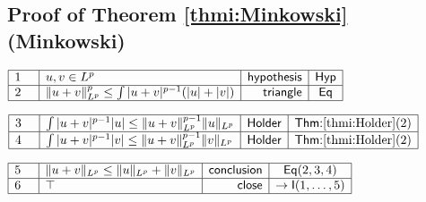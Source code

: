 \documentclass[11pt,reqno]{amsart}
\begin{document}
	\subsection*{Proof of Theorem \protect\ref{thmi:Minkowski} (\textsf{Minkowski})}
	\noindent$\begin{array}{|m{0.5cm}|l|r|c|}
	\hline
	1 & u,v\in L^{p} & \mathsf{hypothesis} & \mathsf{Hyp} \\ \hline
	2 & \|u+v\|_{L^{p}}^{p}\le\int|u+v|^{p-1}(|u|+|v|) & \mathsf{triangle} & \mathsf{Eq} \\ \hline
	\end{array}$
	\par\nointerlineskip\noindent$\begin{array}{|m{0.5cm}|l|r|c|}
	\hline
	3 & \int|u+v|^{p-1}|u|\le\|u+v\|_{L^{p}}^{p-1}\|u\|_{L^{p}} & \mathsf{Holder} & \textsf{Thm:}\ref{thmi:Holder}(2) \\ \hline
	4 & \int|u+v|^{p-1}|v|\le\|u+v\|_{L^{p}}^{p-1}\|v\|_{L^{p}} & \mathsf{Holder} & \textsf{Thm:}\ref{thmi:Holder}(2) \\ \hline
	\end{array}$
	\par\nointerlineskip\noindent$\begin{array}{|m{0.5cm}|l|r|c|}
	\hline
	5 & \|u+v\|_{L^{p}}\le\|u\|_{L^{p}}+\|v\|_{L^{p}} & \mathsf{conclusion} & \mathsf{Eq}(2,3,4) \\ \hline
	6 & \top & \mathsf{close} & \to\mathsf{I}(1,\dots,5) \\ \hline
	\end{array}$
	\medskip
	
\end{document}
